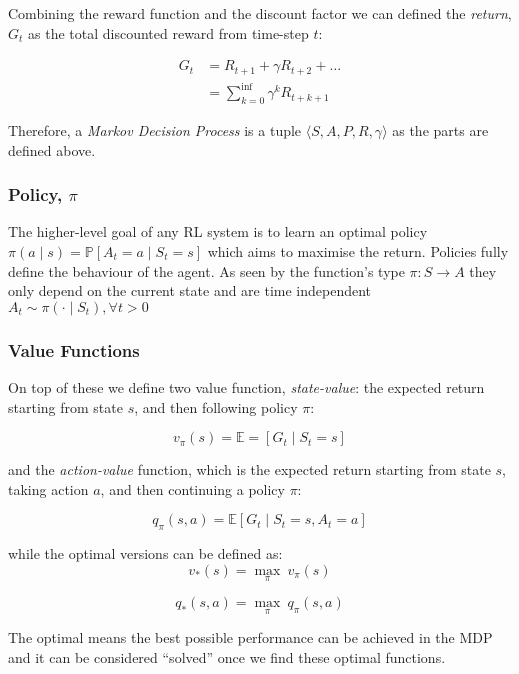     Combining the reward function and the discount factor we can defined the \emph{return}, $G_t$ as the total discounted reward from time-step $t$:

    \[ 
    \begin{aligned}
      G_t &= R_{t+1} + \gamma R_{t+2} + \ldots \\ 
      &= \sum_{k=0}^{\inf}\gamma^k R_{t+k+1} 
    \end{aligned}
    \]
    
    Therefore, a \emph{Markov Decision Process} is a tuple \(\langle S, A, P, R, \gamma \rangle\) as the parts are defined above.
    
    
  \subsubsection{Policy, $\pi$}
    The higher-level goal of any RL system is to learn an optimal policy \(\pi \left( a \mid s\right) = \mathbb{P} \left[A_t = a \mid S_t = s\right]\) which aims to maximise the return. Policies fully define the behaviour of the agent. As seen by the function's type \(\pi: S \rightarrow A \) they only depend on the current state and are time independent \( A_t \sim \pi\left( \cdot \mid S_t\right), \forall t > 0 \)
    
  \subsubsection{Value Functions}
    On top of these we define two value function, \emph{state-value}: the expected return starting from state $s$, and then following policy $\pi$:

    \[ v_\pi \left(s\right) = \mathbb{E} = \left[G_t \mid S_t = s\right]\]

    and the \emph{action-value} function, which is the expected return starting from state $s$, taking action $a$, and then continuing a policy $\pi$:

    \[ q_\pi \left(s, a\right) = \mathbb{E} \left[ G_t \mid S_t = s, A_t = a\right]\]


    while the optimal versions can be defined as:
    \[v_* \left(s\right) = \underset{\pi}{\max} \ v_\pi \left(s\right)\]

    \[q_* \left(s, a\right) = \underset{\pi}{\max} \ q_\pi \left(s, a\right)\]
    
    The optimal means the best possible performance can be achieved in the MDP and it can be considered ``solved'' once we find these optimal functions.

